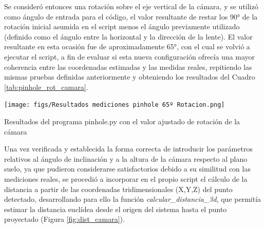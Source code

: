 Se consideró entonces una rotación sobre el eje vertical de la cámara, y se utilizó como ángulo de entrada para el código, el valor resultante de restar los 90° de la rotación inicial asumida en el script menos el ángulo previamente utilizado (definido como el ángulo entre la horizontal y la dirección de la lente). El valor resultante en esta ocasión fue de aproximadamente 65°, con el cual se volvió a ejecutar el script, a fin de evaluar si esta nueva configuración ofrecía una mayor coherencia entre las coordenadas estimadas y las medidas reales, repitiendo las mismas pruebas definidas anteriormente y obteniendo los resultados del Cuadro \ref{tab:pinhole_rot_camara}.

   \begin{table}[H]
   \centering
   \begin{center}
     \texttt{[image: figs/Resultados mediciones pinhole 65º Rotacion.png]}
   \end{center}
   \caption{Resultados del programa pinhole.py con el valor ajustado de rotación de la cámara}
   \label{tab:pinhole_rot_camara}
  \end{table}
  
Una vez verificada y establecida la forma correcta de introducir los parámetros relativos al ángulo de inclinación y a la altura de la cámara respecto al plano suelo, ya que pudieron considerarse satisfactorios debido a su similitud con las mediciones reales, se procedió a incorporar en el propio script el cálculo de la distancia a partir de las coordenadas tridimensionales (X,Y,Z) del punto detectado, desarrollando para ello la función \textit{calcular\_distancia\_3d}, que permitía estimar la distancia euclídea desde el origen del sistema hasta el punto proyectado (Figura \ref{fig:dist_camara}). 

